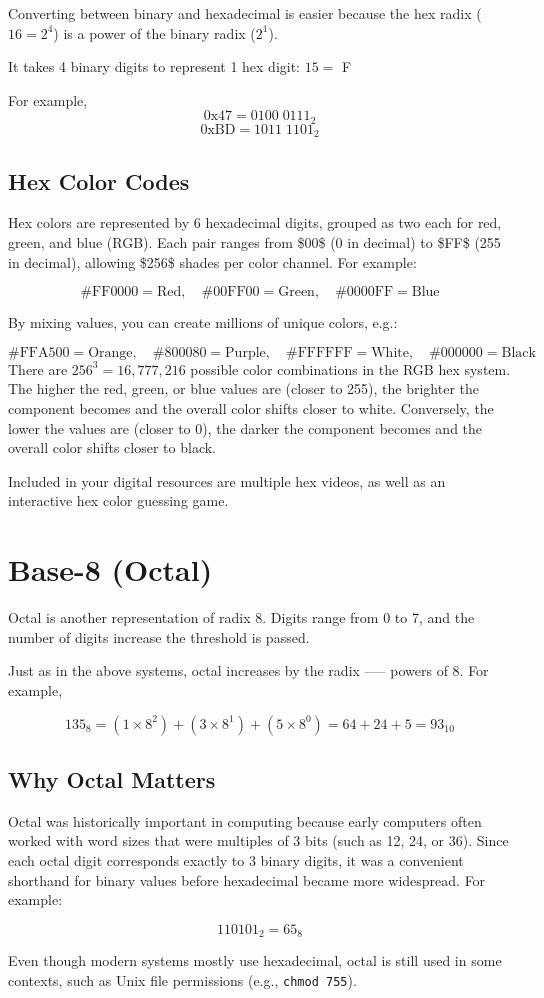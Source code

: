 Converting between binary and hexadecimal is easier because the hex radix ($16 = 2^4$) is a power of the binary radix ($2^1$). 

It takes 4 binary digits to represent 1 hex digit: $15 =$ F

For example,
\[0\text{x}47 = 0100 \; 0111_{2}\]
\[0\text{x}\text{BD} = 1011 \; 1101_{2}\]


\subsection{Hex Color Codes}
Hex colors are represented by 6 hexadecimal digits, grouped as two each for red, green, and blue (RGB). Each pair ranges from \$00\$ (0 in decimal) to \$FF\$ (255 in decimal), allowing \$256\$ shades per color channel. For example:

$$
\#\text{FF}0000 = \text{Red}, \quad\#00\text{FF}00 = \text{Green}, \quad \#0000\text{FF} = \text{Blue}
$$

By mixing values, you can create millions of unique colors, e.g.:

$$
\#\text{FFA}500 = \text{Orange}, \quad \#800080 = \text{Purple}, \quad \#\text{FFFFFF} = \text{White}, \quad \#000000 = \text{Black}
$$
There are $256^3 = 16{,}777{,}216$ possible color combinations in the RGB hex system. The higher the red, green, or blue values are (closer to 255), the brighter the component becomes and the overall color shifts closer to white. Conversely, the lower the values are (closer to 0), the darker the component becomes and the overall color shifts closer to black.

Included in your digital resources are multiple hex videos, as well as an interactive hex color guessing game.

\section{Base-8 (Octal)}
Octal is another representation of radix 8. Digits range from 0 to 7, and the number of digits increase the threshold is passed.

Just as in the above systems, octal increases by the radix —-- powers of 8. For example,

$$
135_{8} = (1 \times 8^2) + (3\times 8^1) + (5\times 8^0) = 64 + 24 + 5 = 93_{10}
$$

\subsection{Why Octal Matters}
Octal was historically important in computing because early computers often worked with word sizes that were multiples of 3 bits (such as 12, 24, or 36). Since each octal digit corresponds exactly to 3 binary digits, it was a convenient shorthand for binary values before hexadecimal became more widespread. For example:

$$
110101_2 = 65_8
$$

Even though modern systems mostly use hexadecimal, octal is still used in some contexts, such as Unix file permissions (e.g., \texttt{chmod 755}).

